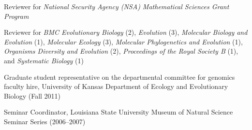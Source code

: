 \myHangIndent
Reviewer for
    \emph{National Security Agency (NSA) Mathematical Sciences Grant Program}

\myHangIndent
Reviewer for
    \emph{BMC Evolutionary Biology} (2),
    \emph{Evolution} (3),
    \emph{Molecular Biology and Evolution} (1),
    \emph{Molecular Ecology} (3),
    \emph{Molecular Phylogenetics and Evolution} (1),
    \emph{Organisms Diversity and Evolution} (2),
    \emph{Proceedings of the Royal Society B} (1),
    and
    \emph{Systematic Biology} (1)

\myHangIndent
Graduate student representative on the departmental committee for
    genomics faculty hire, University of Kansas Department of Ecology and
    Evolutionary Biology (Fall 2011)

\myHangIndent
Seminar Coordinator, Louisiana State University Museum of Natural Science
    Seminar Series (2006--2007)

